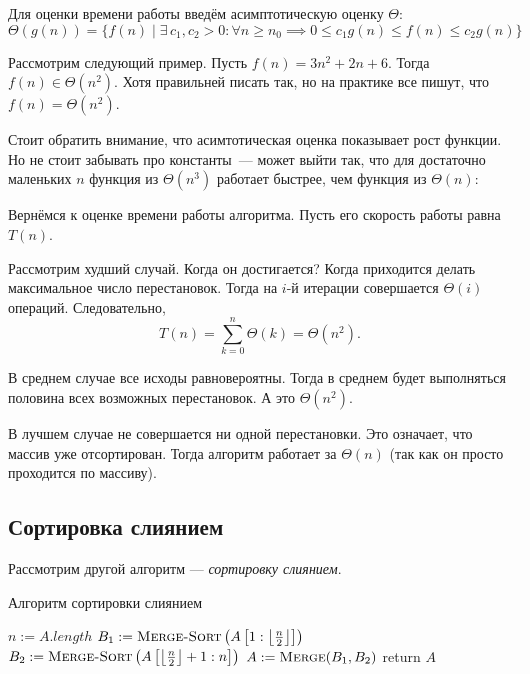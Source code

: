 Для оценки времени работы введём асимптотическую оценку \(\Theta\):
\[\Theta(g(n)) = \{f(n)\mid\exists\,c_1, c_2 > 0: \forall n\geqslant n_0 \implies 0 \leqslant c_1g(n) \leqslant f(n) \leqslant c_2g(n)\}\]

Рассмотрим следующий пример. Пусть \(f(n) = 3n^2 + 2n + 6\). Тогда \(f(n) \in \Theta(n^2)\). Хотя правильней писать так, но на практике все пишут, что \(f(n) = \Theta(n^2)\).

Стоит обратить внимание, что асимтотическая оценка показывает рост функции. Но не стоит забывать про константы~--- может выйти так, что для достаточно маленьких \(n\) функция из \(\Theta(n^3)\) работает быстрее, чем функция из \(\Theta(n)\):
\begin{center}
\end{center}

Вернёмся к оценке времени работы алгоритма. Пусть его скорость работы равна \(T(n)\).

Рассмотрим худший случай. Когда он достигается? Когда приходится делать максимальное число перестановок. Тогда на \(i\)-й итерации совершается \(\Theta(i)\) операций. Следовательно, \[T(n) = \sum_{k = 0}^{n} \Theta(k) = \Theta(n^2).\]

В среднем случае все исходы равновероятны. Тогда в среднем будет выполняться половина всех возможных перестановок. А это \(\Theta(n^2)\).

В лучшем случае не совершается ни одной перестановки. Это означает, что массив уже отсортирован. Тогда алгоритм работает за \(\Theta(n)\) (так как он просто проходится по массиву).

\subsection{Сортировка слиянием}


Рассмотрим другой алгоритм --- \emph{сортировку слиянием}.

\begin{algorithm}[H]
	\caption{Алгоритм сортировки слиянием}
	\begin{algorithmic}[1]
		\State \(n \mathrel{:=} A.length\)
			\State \(B_1 \mathrel{:=} \textsc{Merge-Sort}\left(A\left[1:\left\lfloor\frac{n}{2}\right\rfloor\right]\right)\)
			\State \(B_2 \mathrel{:=} \textsc{Merge-Sort}\left(A\left[\left\lfloor\frac{n}{2}\right\rfloor + 1 : n\right]\right)\)
			\State \(A \mathrel{:=} \textsc{Merge}(B_1, B_2)\) 
		\EndIf
		\State return \(A\)
		\EndFunction
	\end{algorithmic}
\end{algorithm}

